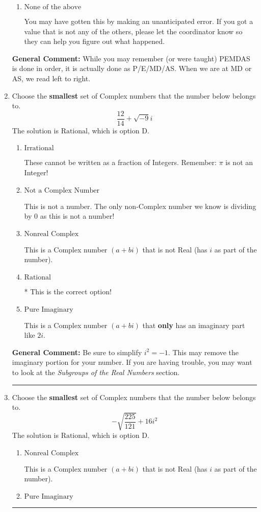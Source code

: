 \documentclass{extbook}[14pt]
\newcommand{\litem}[1]{\item #1

\rule{\textwidth}{0.4pt}}
\begin{document}
\begin{enumerate}
{\begin{enumerate}[label=\Alph*.]
* -268.076, this is the correct option
\item \( \text{None of the above} \)

 You may have gotten this by making an unanticipated error. If you got a value that is not any of the others, please let the coordinator know so they can help you figure out what happened.
\end{enumerate}

\textbf{General Comment:} While you may remember (or were taught) PEMDAS is done in order, it is actually done as P/E/MD/AS. When we are at MD or AS, we read left to right.
}
\litem{
Choose the \textbf{smallest} set of Complex numbers that the number below belongs to.
\[ \frac{12}{14}+\sqrt{-9}i \]The solution is \( \text{Rational} \), which is option D.\begin{enumerate}[label=\Alph*.]
\item \( \text{Irrational} \)

These cannot be written as a fraction of Integers. Remember: $\pi$ is not an Integer!
\item \( \text{Not a Complex Number} \)

This is not a number. The only non-Complex number we know is dividing by 0 as this is not a number!
\item \( \text{Nonreal Complex} \)

This is a Complex number $(a+bi)$ that is not Real (has $i$ as part of the number).
\item \( \text{Rational} \)

* This is the correct option!
\item \( \text{Pure Imaginary} \)

This is a Complex number $(a+bi)$ that \textbf{only} has an imaginary part like $2i$.
\end{enumerate}

\textbf{General Comment:} Be sure to simplify $i^2 = -1$. This may remove the imaginary portion for your number. If you are having trouble, you may want to look at the \textit{Subgroups of the Real Numbers} section.
}
\litem{
Choose the \textbf{smallest} set of Complex numbers that the number below belongs to.
\[ -\sqrt{\frac{225}{121}} + 16i^2 \]The solution is \( \text{Rational} \), which is option D.\begin{enumerate}[label=\Alph*.]
\item \( \text{Nonreal Complex} \)

This is a Complex number $(a+bi)$ that is not Real (has $i$ as part of the number).
\item \( \text{Pure Imaginary} \)


\end{enumerate}}
\end{enumerate}
\end{document}
